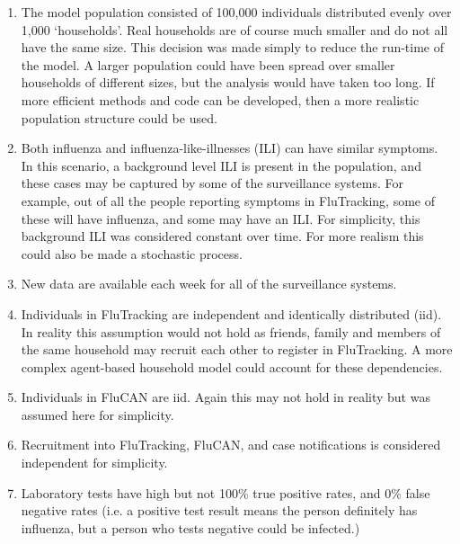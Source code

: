 \begin{enumerate}[{A}.1]
	\item The model population consisted of 100,000 individuals distributed evenly over 1,000 `households'. Real households are of course much smaller and do not all have the same size. This decision was made simply to reduce the run-time of the model. A larger population could have been spread over smaller households of different sizes, but the analysis would have taken too long. If more efficient methods and code can be developed, then a more realistic population structure could be used.
	\item Both influenza and influenza-like-illnesses (ILI) can have similar symptoms. In this scenario, a background level ILI is present in the population, and these cases may be captured by some of the surveillance systems. For example, out of all the people reporting symptoms in FluTracking, some of these will have influenza, and some may have an ILI. For simplicity, this background ILI was considered constant over time. For more realism this could also be made a stochastic process.
	\item New data are available each week for all of the surveillance systems.
	\item Individuals in FluTracking are independent and identically distributed (iid). In reality this assumption would not hold as friends, family and members of the same household may recruit each other to register in FluTracking. A more complex agent-based household model could account for these dependencies.
	\item Individuals in FluCAN are iid. Again this may not hold in reality but was assumed here for simplicity.
	\item Recruitment into FluTracking, FluCAN, and case notifications is considered independent for simplicity.
	\item Laboratory tests have high but not 100\% true positive rates, and 0\% false negative rates (i.e. a positive test result means the person definitely has influenza, but a person who tests negative could be infected.)
\end{enumerate}

